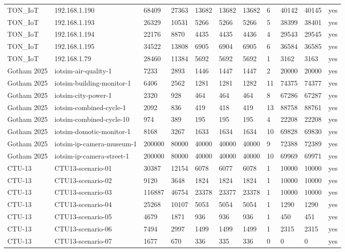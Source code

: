 \begin{tabular}{lllllllllll}
TON\_IoT & 192.168.1.190 & 68409 & 27363 & 13682 & 13682 & 13682 & 6 & 40142 & 40145 & yes \\
TON\_IoT & 192.168.1.193 & 26329 & 10531 & 5266 & 5266 & 5266 & 5 & 38399 & 38401 & yes \\
TON\_IoT & 192.168.1.194 & 22176 & 8870 & 4435 & 4435 & 4436 & 4 & 29543 & 29545 & yes \\
TON\_IoT & 192.168.1.195 & 34522 & 13808 & 6905 & 6904 & 6905 & 6 & 36584 & 36585 & yes \\
TON\_IoT & 192.168.1.79 & 28460 & 11384 & 5692 & 5692 & 5692 & 1 & 3162 & 3163 & yes \\
Gotham 2025 & iotsim-air-quality-1 & 7233 & 2893 & 1446 & 1447 & 1447 & 2 & 20000 & 20000 & yes \\
Gotham 2025 & iotsim-building-monitor-1 & 6406 & 2562 & 1281 & 1281 & 1282 & 11 & 74375 & 74377 & yes \\
Gotham 2025 & iotsim-city-power-1 & 2320 & 928 & 464 & 464 & 464 & 8 & 67286 & 67287 & yes \\
Gotham 2025 & iotsim-combined-cycle-1 & 2092 & 836 & 419 & 418 & 419 & 13 & 88758 & 88761 & yes \\
Gotham 2025 & iotsim-combined-cycle-10 & 974 & 389 & 195 & 195 & 195 & 4 & 22208 & 22208 & yes \\
Gotham 2025 & iotsim-domotic-monitor-1 & 8168 & 3267 & 1633 & 1634 & 1634 & 10 & 69828 & 69830 & yes \\
Gotham 2025 & iotsim-ip-camera-museum-1 & 200000 & 80000 & 40000 & 40000 & 40000 & 9 & 72388 & 72389 & yes \\
Gotham 2025 & iotsim-ip-camera-street-1 & 200000 & 80000 & 40000 & 40000 & 40000 & 10 & 69969 & 69971 & yes \\
CTU-13 & CTU13-scenario-01 & 30387 & 12154 & 6078 & 6077 & 6078 & 1 & 10000 & 10000 & yes \\
CTU-13 & CTU13-scenario-02 & 9120 & 3648 & 1824 & 1824 & 1824 & 1 & 10000 & 10000 & yes \\
CTU-13 & CTU13-scenario-03 & 116887 & 46754 & 23378 & 23377 & 23378 & 1 & 10000 & 10000 & yes \\
CTU-13 & CTU13-scenario-04 & 25268 & 10107 & 5053 & 5054 & 5054 & 1 & 1290 & 1290 & yes \\
CTU-13 & CTU13-scenario-05 & 4679 & 1871 & 936 & 936 & 936 & 1 & 450 & 451 & yes \\
CTU-13 & CTU13-scenario-06 & 7494 & 2997 & 1499 & 1499 & 1499 & 1 & 2315 & 2315 & yes \\
CTU-13 & CTU13-scenario-07 & 1677 & 670 & 336 & 335 & 336 & 0 & 0 & 0 & yes \\

\end{tabular}
